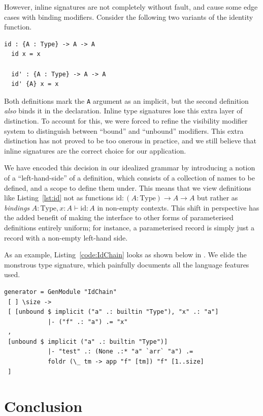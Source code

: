 \documentclass[a4paper,UKenglish,cleveref, autoref, thm-restate,anonymous]{lipics-v2021}
\begin{document}
However, inline signatures are not completely without fault, and cause some edge cases with binding
modifiers. Consider the following two variants of the identity function.
\label{listing:id}
\begin{lstlisting}[style=agda,caption={Two variants of the identity function (\agda).},label=lst:id]
  id : {A : Type} -> A -> A
  id x = x

  id' : {A : Type} -> A -> A
  id' {A} x = x 
\end{lstlisting}

Both definitions mark the \texttt{A} argument as an implicit, but the second definition \emph{also}
binds it in the declaration. Inline type signatures lose this extra layer of
distinction. To account for this, we were forced to refine the visibility modifier system to distinguish
between ``bound'' and ``unbound'' modifiers. This extra distinction has not proved to be too onerous in
practice, and we still believe that inline signatures are the correct choice for our application.

We have encoded this decision in our idealized grammar by introducing a notion of a ``left-hand-side''
of a definition, which consists of a collection of names to be defined, and a scope to define them
under. This means that we view definitions like Listing~\ref{lst:id} not as
functions \(\mathrm{id} : (A : \mathrm{Type}) \to A \to A\) but rather as \emph{bindings}
\(A : \mathrm{Type}, x : A \vdash \mathrm{id} : A\) in non-empty contexts.
This shift in perspective has the added benefit of making the interface to
other forms of parameterised definitions entirely uniform; for instance, a
parameterised record is simply just a record with a non-empty left-hand side.

As an example, Listing~\ref{code:IdChain} looks as shown below in \panbench. We elide
the monstrous type signature, which painfully documents all the language features used.
\begin{lstlisting}[style=haskell,caption={The IdChain test.}]
generator = GenModule "IdChain"
 [ ] \size ->
 [ [unbound $ implicit ("a" .: builtin "Type"), "x" .: "a"] 
            |- ("f" .: "a") .= "x"
 ,
 [unbound $ implicit ("a" .: builtin "Type")] 
            |- "test" .: (None .:* "a" `arr` "a") .=
            foldr (\_ tm -> app "f" [tm]) "f" [1..size]
 ]
\end{lstlisting}

\section{Conclusion}
\label{sec:conc}
\end{document}
